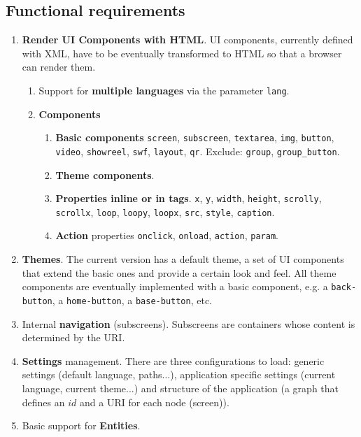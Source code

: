\subsection*{Functional requirements}
\begin{enumerate}
    \item \textbf{Render \ac{UI} Components with \ac{HTML}}. \ac{UI} components, currently defined with \ac{XML}, have to be eventually transformed to \ac{HTML} so that a browser can render them.
    \begin{enumerate}
        \item Support for \textbf{multiple languages} via the parameter \texttt{lang}.
        \item \textbf{Components} 
        \begin{enumerate}
            \item \textbf{Basic components} \texttt{screen}, \texttt{subscreen}, \texttt{textarea}, \texttt{img}, \texttt{button}, \texttt{video}, \texttt{showreel}, \texttt{swf}, \texttt{layout}, \texttt{qr}.  Exclude: \texttt{group}, \texttt{group\_button}.
            \item \textbf{Theme components}.
            \item \textbf{Properties inline or in tags}. \texttt{x}, \texttt{y}, \texttt{width}, \texttt{height}, \texttt{scrolly}, \texttt{scrollx}, \texttt{loop}, \texttt{loopy}, \texttt{loopx}, \texttt{src}, \texttt{style}, \texttt{caption}.
            \item \textbf{Action} properties \texttt{onclick}, \texttt{onload}, \texttt{action}, \texttt{param}.
        \end{enumerate}
        
    \end{enumerate}
    \item \textbf{Themes}. The current version has a default theme, a set of \ac{UI} components that extend the basic ones and provide a certain look and feel. All theme components are eventually implemented with a basic component, e.g. a \texttt{back-button}, a \texttt{home-button}, a \texttt{base-button}, etc.
    \item Internal \textbf{navigation} (subscreens). Subscreens are containers whose content is determined by the \ac{URI}.
    \item \textbf{Settings} management. There are three configurations to load: generic settings (default language, paths...), application specific settings (current language, current theme...) and structure of the application (a graph that defines an $id$ and a \ac{URI} for each node (screen)).
    \item Basic support for \textbf{Entities}.
\end{enumerate}

